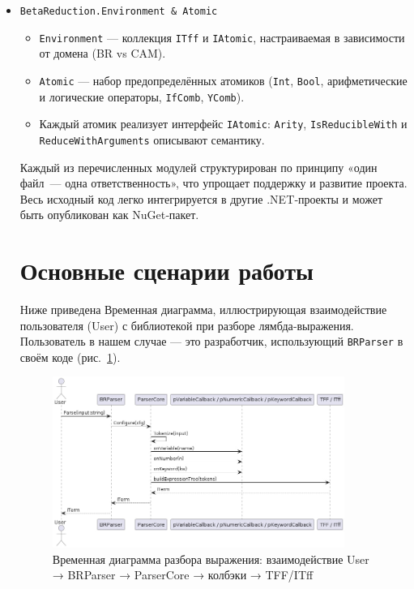 \begin{itemize}
  \item \texttt{BetaReduction.Environment \& Atomic}  
    \begin{itemize}
      \item \texttt{Environment} — коллекция \texttt{ITff} и \texttt{IAtomic}, настраиваемая в зависимости от домена (BR vs CAM).  
      \item \texttt{Atomic} — набор предопределённых атомиков (\texttt{Int}, \texttt{Bool}, арифметические и логические операторы, \texttt{IfComb}, \texttt{YComb}).  
      \item Каждый атомик реализует интерфейс \texttt{IAtomic}:  
        \texttt{Arity}, \texttt{IsReducibleWith} и \texttt{ReduceWithArguments} описывают семантику.
    \end{itemize}


\noindent
Каждый из перечисленных модулей структурирован по принципу «один файл — одна ответственность», что упрощает поддержку и развитие проекта. Весь исходный код легко интегрируется в другие .NET‑проекты и может быть опубликован как NuGet‑пакет.


\section{Основные сценарии работы}

Ниже приведена Временная диаграмма, иллюстрирующая взаимодействие пользователя (User) с библиотекой при разборе лямбда‑выражения. Пользователь в нашем случае — это разработчик, использующий \texttt{BRParser} в своём коде (рис.~\ref{fig:parser-sequence}).

\begin{figure}[h]
  \centering
  \includegraphics[width=0.9\textwidth]{./img/image.png}
  \caption{Временная диаграмма разбора выражения: взаимодействие User → BRParser → ParserCore → колбэки → TFF/ITff}
  \label{fig:parser-sequence}
\end{figure}


\end{itemize}
